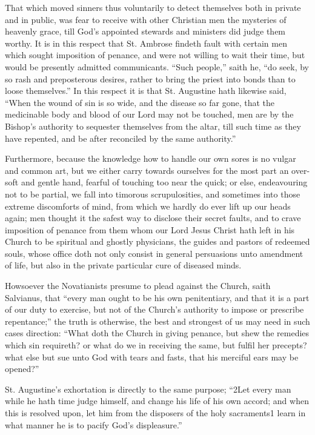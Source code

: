 That which moved sinners thus voluntarily to detect themselves both in private and in public, was fear to receive with other Christian men the mysteries of heavenly grace, till God’s appointed stewards and ministers did judge them worthy. It is in this respect that St. Ambrose findeth fault with certain men which sought imposition of penance, and were not willing to wait their time, but would be presently admitted communicants. “Such people,” saith he, “do seek, by so rash and preposterous desires, rather to bring the priest into bonds than to loose themselves.” In this respect it is that St. Augustine hath likewise said, “When  the wound of sin is so wide, and the disease so far gone, that the medicinable body and blood of our Lord may not be touched, men are by the Bishop’s authority to sequester themselves from the altar, till such time as they have repented, and be after reconciled by the same authority.”

Furthermore, because the knowledge how to handle our own sores is no vulgar and common art, but we either carry towards ourselves for the most part an over-soft and gentle hand, fearful of touching too near the quick; or else, endeavouring not to be partial, we fall into timorous scrupulosities, and sometimes into those extreme discomforts of mind, from which we hardly do ever lift up our heads again; men thought it the safest way to disclose their secret faults, and to crave imposition of penance from them whom our Lord Jesus Christ hath left in his Church to be spiritual and ghostly physicians, the guides and pastors of redeemed souls, whose office doth not only consist in general persuasions unto amendment of life, but also in the private particular cure of diseased minds.

Howsoever the Novatianists presume to plead against the Church, saith Salvianus, that “every man ought to be his own penitentiary, and that it is a part of our duty to exercise, but not of the Church’s authority to impose or prescribe repentance;” the truth is otherwise, the best and strongest of us may need in such cases direction: “What doth the Church in giving penance, but shew the remedies which sin requireth? or what do we in receiving the same, but fulfil her precepts? what else but sue unto God with tears and fasts, that his merciful ears may be opened?”

St. Augustine’s exhortation is directly to the same purpose; “2Let every man while he hath time judge himself, and  change his life of his own accord; and when this is resolved upon, let him from the disposers of the holy sacraments1 learn in what manner he is to pacify God’s displeasure.”

